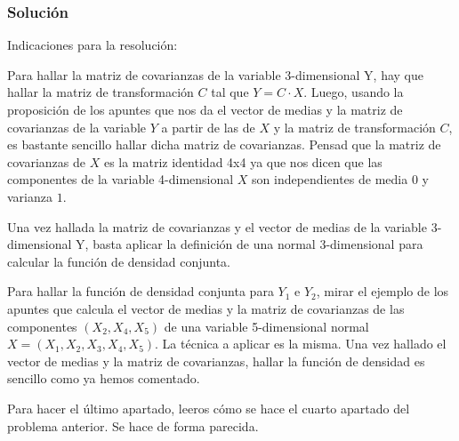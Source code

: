 \documentclass[
]{article}
\begin{document}
\hypertarget{soluciuxf3n-6}{%
\subsubsection{Solución}\label{soluciuxf3n-6}}

Indicaciones para la resolución:

Para hallar la matriz de covarianzas de la variable 3-dimensional Y, hay
que hallar la matriz de transformación \(C\) tal que \(Y=C\cdot X\).
Luego, usando la proposición de los apuntes que nos da el vector de
medias y la matriz de covarianzas de la variable \(Y\) a partir de las
de \(X\) y la matriz de transformación \(C\), es bastante sencillo
hallar dicha matriz de covarianzas. Pensad que la matriz de covarianzas
de \(X\) es la matriz identidad 4x4 ya que nos dicen que las componentes
de la variable 4-dimensional \(X\) son independientes de media \(0\) y
varianza \(1\).

Una vez hallada la matriz de covarianzas y el vector de medias de la
variable 3-dimensional Y, basta aplicar la definición de una normal
3-dimensional para calcular la función de densidad conjunta.

Para hallar la función de densidad conjunta para \(Y_1\) e \(Y_2\),
mirar el ejemplo de los apuntes que calcula el vector de medias y la
matriz de covarianzas de las componentes \((X_2,X_4,X_5)\) de una
variable 5-dimensional normal \(X=(X_1,X_2,X_3,X_4,X_5)\). La técnica a
aplicar es la misma. Una vez hallado el vector de medias y la matriz de
covarianzas, hallar la función de densidad es sencillo como ya hemos
comentado.

Para hacer el último apartado, leeros cómo se hace el cuarto apartado
del problema anterior. Se hace de forma parecida.
\end{document}
